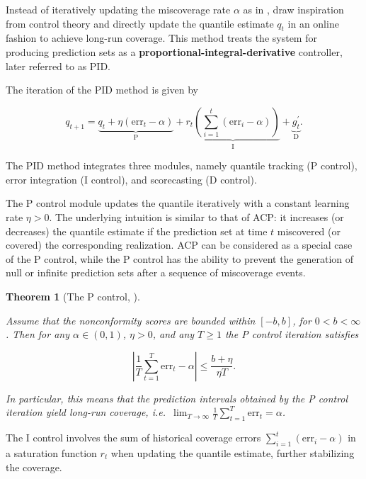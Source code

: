 \documentclass[
  11pt,
  a4paper,
]{article}
\theoremstyle{plain}
\theoremstyle{plain}
\newtheorem{theorem}{Theorem}[section]
\theoremstyle{remark}
\begin{document}
Instead of iteratively updating the miscoverage rate \(\alpha\) as in
\textcite{gibbs2021}, \textcite{angelopoulos2024} draw inspiration from
control theory and directly update the quantile estimate \(q_t\) in an
online fashion to achieve long-run coverage. This method treats the
system for producing prediction sets as a
\textbf{proportional-integral-derivative} controller, later referred to
as PID.

The iteration of the PID method is given by

\[
q_{t+1}=\underbrace{q_t+\eta \left(\mathrm{err}_t-\alpha\right)}_{\mathrm{P}}+\underbrace{r_t\left(\sum_{i=1}^t \left(\mathrm{err}_i-\alpha\right)\right)}_{\mathrm{I}}+\underbrace{g_t^{\prime}}_{\mathrm{D}}.
\]

The PID method integrates three modules, namely quantile tracking (P
control), error integration (I control), and scorecasting (D control).

The P control module updates the quantile iteratively with a constant
learning rate \(\eta > 0\). The underlying intuition is similar to that
of ACP: it increases (or decreases) the quantile estimate if the
prediction set at time \(t\) miscovered (or covered) the corresponding
realization. ACP can be considered as a special case of the P control,
while the P control has the ability to prevent the generation of null or
infinite prediction sets after a sequence of miscoverage events.

\begin{theorem}[The P control,
\textcite{angelopoulos2024}]\protect\hypertarget{thm-pid_p}{}\label{thm-pid_p}

Assume that the nonconformity scores are bounded within \([-b, b]\), for
\(0<b<\infty\). Then for any \(\alpha \in (0,1)\), \(\eta > 0\), and any
\(T \geq 1\) the P control iteration satisfies

\[
|\frac{1}{T}\sum_{t=1}^{T}\mathrm{err}_t - \alpha| \leq \frac{b+\eta}{\eta T}.
\]

In particular, this means that the prediction intervals obtained by the
P control iteration yield long-run coverage,
i.e.~\(\lim _{T \rightarrow \infty} \frac{1}{T} \sum_{t=1}^T \mathrm{err}_t = \alpha\).

\end{theorem}

The I control involves the sum of historical coverage errors
\(\sum_{i=1}^t (\mathrm{err}_i-\alpha)\) in a saturation function
\(r_t\) when updating the quantile estimate, further stabilizing the
coverage.
\end{document}
